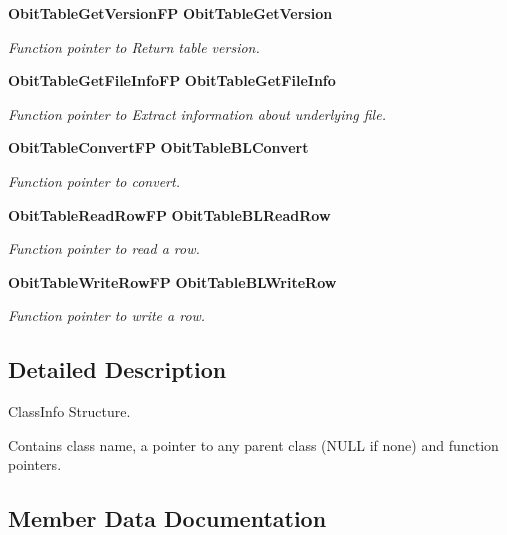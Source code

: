 \begin{CompactItemize}
{\bf Obit\-Table\-Get\-Version\-FP} {\bf Obit\-Table\-Get\-Version}
\begin{CompactList}\small\item\em Function pointer to Return table version. \item\end{CompactList}\item 
{\bf Obit\-Table\-Get\-File\-Info\-FP} {\bf Obit\-Table\-Get\-File\-Info}
\begin{CompactList}\small\item\em Function pointer to Extract information about underlying file. \item\end{CompactList}\item 
{\bf Obit\-Table\-Convert\-FP} {\bf Obit\-Table\-BLConvert}
\begin{CompactList}\small\item\em Function pointer to convert. \item\end{CompactList}\item 
{\bf Obit\-Table\-Read\-Row\-FP} {\bf Obit\-Table\-BLRead\-Row}
\begin{CompactList}\small\item\em Function pointer to read a row. \item\end{CompactList}\item 
{\bf Obit\-Table\-Write\-Row\-FP} {\bf Obit\-Table\-BLWrite\-Row}
\begin{CompactList}\small\item\em Function pointer to write a row. \item\end{CompactList}\end{CompactItemize}


\subsection{Detailed Description}
Class\-Info Structure. 

Contains class name, a pointer to any parent class (NULL if none) and function pointers. 



\subsection{Member Data Documentation}

